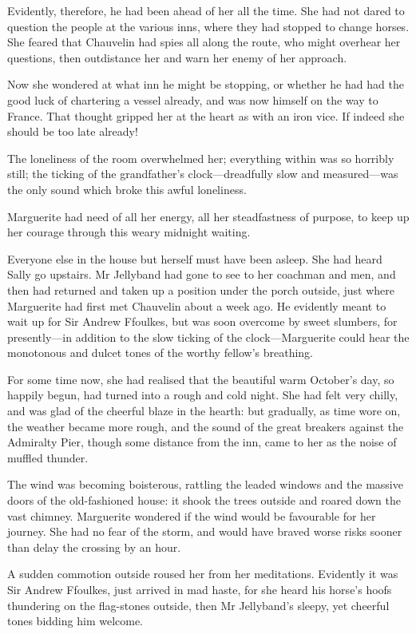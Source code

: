 Evidently, therefore, he had been ahead of her all the time. She had not dared to question the people at the various inns, where they had stopped to change horses. She feared that Chauvelin had spies all along the route, who might overhear her questions, then outdistance her and warn her enemy of her approach.

Now she wondered at what inn he might be stopping, or whether he had had the good luck of chartering a vessel already, and was now himself on the way to France. That thought gripped her at the heart as with an iron vice. If indeed she should be too late already!

The loneliness of the room overwhelmed her; everything within was so horribly still; the ticking of the grandfather's clock\allowbreak---\allowbreak dreadfully slow and measured\allowbreak---\allowbreak was the only sound which broke this awful loneliness.

Marguerite had need of all her energy, all her steadfastness of purpose, to keep up her courage through this weary midnight waiting.

Everyone else in the house but herself must have been asleep. She had heard Sally go upstairs. Mr Jellyband had gone to see to her coachman and men, and then had returned and taken up a position under the porch outside, just where Marguerite had first met Chauvelin about a week ago. He evidently meant to wait up for Sir Andrew Ffoulkes, but was soon overcome by sweet slumbers, for presently\allowbreak---\allowbreak in addition to the slow ticking of the clock\allowbreak---\allowbreak Marguerite could hear the monotonous and dulcet tones of the worthy fellow's breathing.

For some time now, she had realised that the beautiful warm October's day, so happily begun, had turned into a rough and cold night. She had felt very chilly, and was glad of the cheerful blaze in the hearth: but gradually, as time wore on, the weather became more rough, and the sound of the great breakers against the Admiralty Pier, though some distance from the inn, came to her as the noise of muffled thunder.

The wind was becoming boisterous, rattling the leaded windows and the massive doors of the old-fashioned house: it shook the trees outside and roared down the vast chimney. Marguerite wondered if the wind would be favourable for her journey. She had no fear of the storm, and would have braved worse risks sooner than delay the crossing by an hour.

A sudden commotion outside roused her from her meditations. Evidently it was Sir Andrew Ffoulkes, just arrived in mad haste, for she heard his horse's hoofs thundering on the flag-stones outside, then Mr Jellyband's sleepy, yet cheerful tones bidding him welcome.

